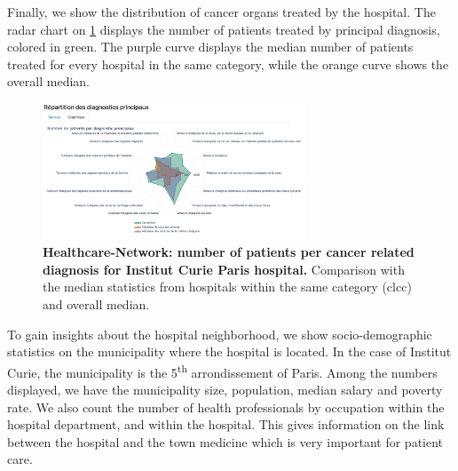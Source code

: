 Finally, we show the distribution of cancer organs treated by the hospital. The
radar chart on \cref{fig:hn-curie-dp} displays the number of patients treated by
principal diagnosis, colored in green. The purple curve displays the median
number of patients treated for every hospital in the same category, while the
orange curve shows the overall median.

\begin{figure}[H]
    \includegraphics[width=0.7\textwidth]{images/healthcare-network/curie-dp.png}
    \centering
    \caption{ \textbf{Healthcare-Network: number of patients per cancer related
            diagnosis for Institut Curie Paris hospital.} Comparison with the median
        statistics from hospitals within the same category (\ac{clcc}) and
        overall median. }
    \label{fig:hn-curie-dp}
\end{figure}

To gain insights about the hospital neighborhood, we show socio-demographic
statistics on the municipality where the hospital is located. In the case of
Institut Curie, the municipality is the 5\textsuperscript{th} arrondissement of
Paris. Among the numbers displayed, we have the municipality size, population,
median salary and poverty rate. We also count the number of health professionals
by occupation within the hospital department, and within the hospital. This
gives information on the link between the hospital and the town medicine which
is very important for patient care.

